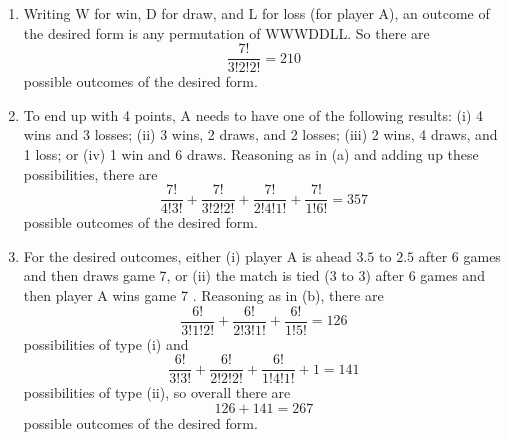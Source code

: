 
\setcounter{theorem}{6}
\begin{exercise}[BH.1.7]
	\begin{solution}
\begin{enumerate}
	\item   Writing W for win, D for draw, and L for loss (for player A), an outcome of the desired form is any permutation of WWWDDLL. So there are
	$$
	\frac{7 !}{3 ! 2 ! 2 !}=210
	$$
	possible outcomes of the desired form.
	\item   To end up with 4 points, A needs to have one of the following results: (i) 4 wins and 3 losses; (ii) 3 wins, 2 draws, and 2 losses; (iii) 2 wins, 4 draws, and 1 loss; or (iv) 1 win and 6 draws. Reasoning as in (a) and adding up these possibilities, there are
	$$
	\frac{7 !}{4 ! 3 !}+\frac{7 !}{3 ! 2 ! 2 !}+\frac{7 !}{2 ! 4 ! 1 !}+\frac{7 !}{1 ! 6 !}=357
	$$
	possible outcomes of the desired form.
	\item   For the desired outcomes, either (i) player A is ahead $3.5$ to $2.5$ after 6 games and then draws game 7, or (ii) the match is tied (3 to 3) after 6 games and then player A wins game 7 . Reasoning as in (b), there are
	$$
	\frac{6 !}{3 ! 1 ! 2 !}+\frac{6 !}{2 ! 3 ! 1 !}+\frac{6 !}{1 ! 5 !}=126
	$$
	possibilities of type (i) and
	$$
	\frac{6 !}{3 ! 3 !}+\frac{6 !}{2 ! 2 ! 2 !}+\frac{6 !}{1 ! 4 ! 1 !}+1=141
	$$
	possibilities of type (ii), so overall there are
	$$
	126+141=267
	$$
	possible outcomes of the desired form.
\end{enumerate}
	\end{solution}
\end{exercise}


